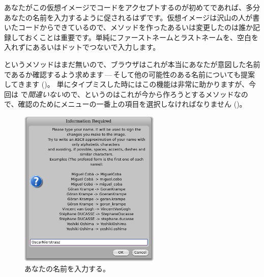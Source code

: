 \documentclass[a4paper,10pt,twoside]{book}
\begin{document}
あなたがこの仮想イメージでコードをアクセプトするのが初めてであれば、多分あなたの名前を入力するように促されるはずです。仮想イメージは沢山の人が書いたコードからできているので、メソッドを作ったあるいは変更したのは誰か記録しておくことは重要です。単純にファーストネームとラストネームを、空白を入れずにあるいはドットでつないで入力します。


 というメソッドはまだ無いので、ブラウザはこれが本当にあなたが意図した名前であるか確認するよう求めます\,---\,そして他の可能性のある名前についても提案してきます ()。
単にタイプミスした時にはこの機能は非常に助かりますが、今回は  で\emph{間違いない}ので、というのはこれが今から作ろうとするメソッドなので、確認のためにメニューの一番上の項目を選択しなければなりません ()。



\begin{figure}[htb]
\centerline {\includegraphics[width=0.6\textwidth]{name}}
\caption{あなたの名前を入力する。}
\end{figure}
\end{document}
